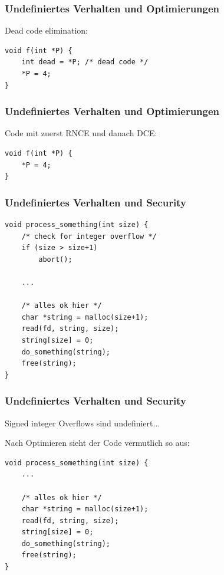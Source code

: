 \documentclass[12pt,compress]{beamer}
\begin{document}
\begin{frame}[fragile]
\frametitle{Undefiniertes Verhalten und Optimierungen}

Dead code elimination:

\vfill

\begin{lstlisting}
void f(int *P) {
    int dead = *P; /* dead code */
    *P = 4;
}
\end{lstlisting}
\end{frame}


\begin{frame}[fragile]
\frametitle{Undefiniertes Verhalten und Optimierungen}

Code mit zuerst RNCE und danach DCE:

\vfill

\begin{lstlisting}
void f(int *P) {
    *P = 4;
}
\end{lstlisting}
\end{frame}


\begin{frame}[fragile]
\frametitle{Undefiniertes Verhalten und Security}
\begin{lstlisting}
void process_something(int size) {
    /* check for integer overflow */
    if (size > size+1)
        abort();
    
    ...

    /* alles ok hier */
    char *string = malloc(size+1);
    read(fd, string, size);
    string[size] = 0;
    do_something(string);
    free(string);
}
\end{lstlisting}
\end{frame}


\begin{frame}[fragile]
\frametitle{Undefiniertes Verhalten und Security}

Signed integer Overflows sind undefiniert...

\vfill

Nach Optimieren sieht der Code vermutlich so aus:

\vfill

\begin{lstlisting}
void process_something(int size) {
    ...

    /* alles ok hier */
    char *string = malloc(size+1);
    read(fd, string, size);
    string[size] = 0;
    do_something(string);
    free(string);
}
\end{lstlisting}
\end{frame}
\end{document}
